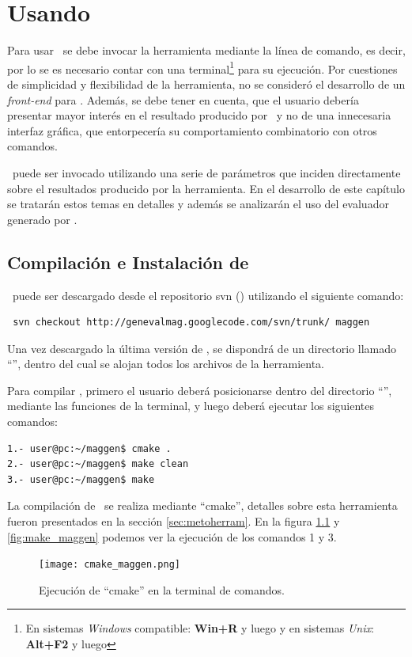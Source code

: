 \chapter{Usando \maggen}
\label{chap:usos}
\minitoc

Para usar \maggen\ se debe invocar la herramienta mediante la línea de comando, es decir, por lo se es necesario contar con una terminal\footnote{En sistemas \textit{Windows} compatible: \textbf{Win+R} y luego  y en sistemas \textit{Unix}: \textbf{Alt+F2} y luego } para su ejecución. Por cuestiones de simplicidad y flexibilidad de la herramienta, no se consideró el desarrollo de un \textit{front-end} para \maggen. Además, se debe tener en cuenta, que el usuario debería presentar mayor interés en el resultado producido por \maggen\ y no de una innecesaria interfaz gráfica, que entorpecería su comportamiento combinatorio con otros comandos.
  
\maggen\ puede ser invocado utilizando una serie de parámetros que inciden directamente sobre el resultados producido por la herramienta. En el desarrollo de este capítulo se tratarán estos temas en detalles y además se analizarán el uso del evaluador generado por \maggen.

\section{Compilación e Instalación de \maggen}
\maggen\ puede ser descargado desde el repositorio svn (\cite{svn-book}) utilizando el siguiente comando:
\begin{verbatim}
 svn checkout http://genevalmag.googlecode.com/svn/trunk/ maggen
\end{verbatim}

Una vez descargado la última versión de \maggen, se dispondrá de un directorio llamado ``'', dentro del cual se alojan todos los archivos de la herramienta.

Para compilar \maggen, primero el usuario deberá posicionarse dentro del directorio ``'', mediante las funciones de la terminal, y luego deberá ejecutar los siguientes comandos:
{\small\begin{verbatim}
1.- user@pc:~/maggen$ cmake .
2.- user@pc:~/maggen$ make clean
3.- user@pc:~/maggen$ make
\end{verbatim}}
La compilación de \maggen\ se realiza mediante ``cmake'', detalles sobre esta herramienta fueron presentados en la sección \ref{sec:metoherram}. 
En la figura \ref{fig:cmake_maggen} y \ref{fig:make_maggen} podemos ver la ejecución de los comandos 1 y 3.
\begin{figure}[!ht]\centering
\texttt{[image: cmake\_maggen.png]}
\caption{\label{fig:cmake_maggen} Ejecución de ``cmake'' en la terminal de comandos.}
\end{figure}

